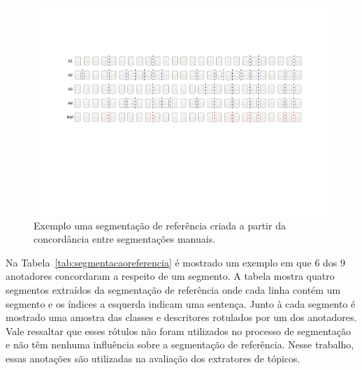   \begin{center}
	\begin{figure}[h!]

	\includegraphics[trim={ 95 255 75 140 },clip,page=1,width=\textwidth]{conteudo/capitulos/figs/segmentacao-referencia.pdf}

	\caption{Exemplo uma segmentação de referência criada a partir da concordância entre segmentações manuais.}
	\label{fig:concordanciasegref}
	\end{figure}
\end{center}








Na Tabela~\ref{tab:segmentacaoreferencia} é mostrado um exemplo em que 6 dos 9 anotadores concordaram a respeito de um segmento. A tabela mostra quatro segmentos extraídos da segmentação de referência onde cada linha contém um segmento e os índices a esquerda indicam uma sentença. Junto à cada segmento é mostrado uma amostra das classes e descritores rotulados por um dos anotadores. Vale ressaltar que esses rótulos não foram utilizados no processo de segmentação e não têm nenhuma influência sobre a segmentação de referência. Nesse trabalho, essas anotações são utilizadas na avaliação dos extratores de tópicos.

